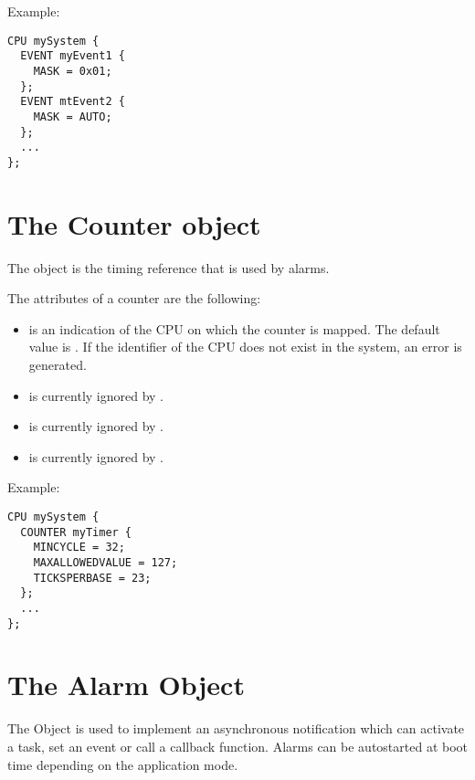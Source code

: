 Example:

\begin{lstlisting}
CPU mySystem {
  EVENT myEvent1 {
    MASK = 0x01;
  };
  EVENT mtEvent2 {
    MASK = AUTO;
  };
  ...
};
\end{lstlisting}



\section{The Counter object}
\label{sec:counter-extensions}

The  object is the timing reference that is used by alarms.

The attributes of a counter are the following:
\begin{itemize}
\item {} is an indication
  of the CPU on which the counter is mapped. The default value is
  . If the identifier of the CPU does not exist in
  the system, an error is generated.
\item {} is currently ignored by \ee.
\item {} is currently ignored by \ee.
\item {} is currently ignored by \ee.
%
%
\end{itemize}

Example:

\begin{lstlisting}
CPU mySystem {
  COUNTER myTimer {
    MINCYCLE = 32;
    MAXALLOWEDVALUE = 127;
    TICKSPERBASE = 23;
  };
  ...
};
\end{lstlisting}

\section{The Alarm Object}

The  Object is used to implement an asynchronous
notification which can activate a task, set an event or call a
callback function. Alarms can be autostarted at boot time depending on
the application mode.


